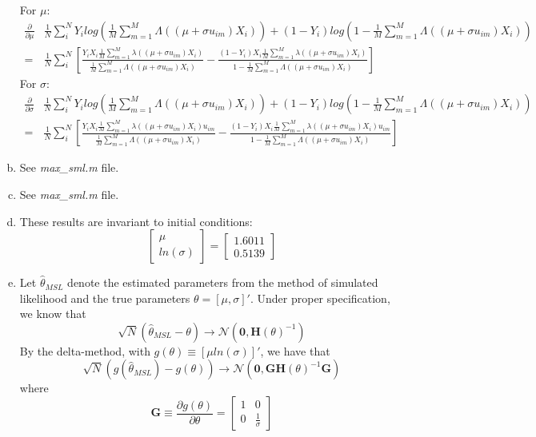 \documentclass[11pt]{article}
\begin{document}
\begin{enumerate}[a)]
	For $\mu$:
	\begin{align*}
		\frac{\partial}{\partial \mu} & \frac{1}{N}\sum_{i}^{N} Y_i log\left(\frac{1}{M}\sum_{m=1}^M\Lambda((\mu+\sigma u_{im})X_i)\right) + (1-Y_i) log\left(1-\frac{1}{M}\sum_{m=1}^M\Lambda((\mu+\sigma u_{im})X_i)\right) \\
		= & \frac{1}{N}\sum_i^N \left[\frac{Y_iX_i\frac{1}{M}\sum_{m=1}^M\lambda((\mu+\sigma u_{im})X_i)}{\frac{1}{M}\sum_{m=1}^M\Lambda((\mu+\sigma u_{im})X_i)} - \frac{(1-Y_i)X_i\frac{1}{M}\sum_{m=1}^M\lambda((\mu+\sigma u_{im})X_i)}{1-\frac{1}{M}\sum_{m=1}^M\Lambda((\mu+\sigma u_{im})X_i)} \right] 
	\end{align*}
	For $\sigma$:
		\begin{align*}
		\frac{\partial}{\partial \sigma} & \frac{1}{N}\sum_{i}^{N} Y_i log\left(\frac{1}{M}\sum_{m=1}^M\Lambda((\mu+\sigma u_{im})X_i)\right) + (1-Y_i) log\left(1-\frac{1}{M}\sum_{m=1}^M\Lambda((\mu+\sigma u_{im})X_i)\right) \\
		= & \frac{1}{N}\sum_i^N \left[\frac{Y_i X_i\frac{1}{M}\sum_{m=1}^M\lambda((\mu+\sigma u_{im})X_i)u_{im}}{\frac{1}{M}\sum_{m=1}^M\Lambda((\mu+\sigma u_{im})X_i)} - \frac{(1-Y_i)X_i\frac{1}{M}\sum_{m=1}^M\lambda((\mu+\sigma u_{im})X_i) u_{im}}{1-\frac{1}{M}\sum_{m=1}^M\Lambda((\mu+\sigma u_{im})X_i)}\right]
		\end{align*}
	\item See \textit{max\_sml.m} file.
	\item See \textit{max\_sml.m} file.
	\item These results are invariant to initial conditions:
	$$\begin{bmatrix}\mu \\ ln(\sigma)\end{bmatrix} 
	= \begin{bmatrix} 1.6011 \\ 0.5139 \end{bmatrix}$$
	\item Let $\hat \theta_{MSL}$ denote the estimated parameters from the method of simulated likelihood and the true parameters $\theta = [\mu, \sigma]'$. Under proper specification, we know that
	$$\sqrt{N}(\hat \theta_{MSL} - \theta) \to 
	\mathcal{N}(\mathbf{0},\mathbf{H}(\theta)^{-1})$$
	By the delta-method, with $g(\theta) \equiv [\mu ln(\sigma)]'$, we have that
	$$\sqrt{N}(g(\hat \theta_{MSL}) - g(\theta)) \to 
	\mathcal{N}(\mathbf{0},\mathbf{G}\mathbf{H}(\theta)^{-1}\mathbf{G})$$
	where $$\mathbf{G} \equiv \frac{\partial g(\theta)}{\partial \theta} = \begin{bmatrix}1 & 0 \\ 0 & \frac{1}{\sigma}\end{bmatrix}$$


\end{enumerate}
\end{document}
